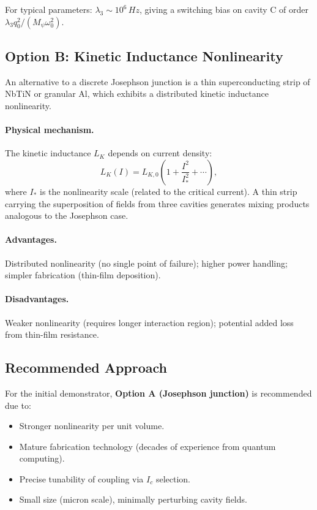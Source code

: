 \documentclass[12pt,a4paper]{article}
\begin{document}
For typical parameters: $\lambda_3 \sim 10^6\,\si{Hz}$, giving a switching bias on cavity C of order $\lambda_3 q_0^2 / (M_\psi \omega_0^2)$.

\subsection{Option B: Kinetic Inductance Nonlinearity}

An alternative to a discrete Josephson junction is a thin superconducting strip of NbTiN or granular Al, which exhibits a distributed kinetic inductance nonlinearity.

\paragraph{Physical mechanism.} The kinetic inductance $L_K$ depends on current density:
\begin{equation}
L_K(I) = L_{K,0}\left(1 + \frac{I^2}{I_*^2} + \cdots\right),
\end{equation}
where $I_*$ is the nonlinearity scale (related to the critical current). A thin strip carrying the superposition of fields from three cavities generates mixing products analogous to the Josephson case.

\paragraph{Advantages.} Distributed nonlinearity (no single point of failure); higher power handling; simpler fabrication (thin-film deposition).

\paragraph{Disadvantages.} Weaker nonlinearity (requires longer interaction region); potential added loss from thin-film resistance.

\subsection{Recommended Approach}

For the initial demonstrator, \textbf{Option A (Josephson junction)} is recommended due to:
\begin{itemize}
\item Stronger nonlinearity per unit volume.
\item Mature fabrication technology (decades of experience from quantum computing).
\item Precise tunability of coupling via $I_c$ selection.
\item Small size (micron scale), minimally perturbing cavity fields.
\end{itemize}
\end{document}
